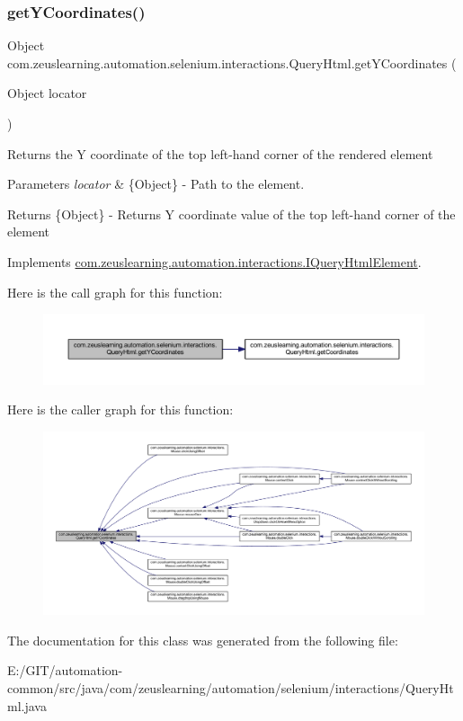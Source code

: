 \subsubsection{\texorpdfstring{get\+Y\+Coordinates()}{getYCoordinates()}}
{\footnotesize\ttfamily Object com.\+zeuslearning.\+automation.\+selenium.\+interactions.\+Query\+Html.\+get\+Y\+Coordinates (\begin{DoxyParamCaption}\item[{Object}]{locator }\end{DoxyParamCaption})\hspace{0.3cm}{\ttfamily [inline]}}

Returns the Y coordinate of the top left-\/hand corner of the rendered element


\begin{DoxyParams}{Parameters}
{\em locator} & \{Object\} -\/ Path to the element. \\
\hline
\end{DoxyParams}
\begin{DoxyReturn}{Returns}
\{Object\} -\/ Returns Y coordinate value of the top left-\/hand corner of the element 
\end{DoxyReturn}


Implements \hyperlink{interfacecom_1_1zeuslearning_1_1automation_1_1interactions_1_1IQueryHtmlElement_a7fa59044cee483ac710d06186d46776c}{com.\+zeuslearning.\+automation.\+interactions.\+I\+Query\+Html\+Element}.

Here is the call graph for this function\+:
\nopagebreak
\begin{figure}[H]
\begin{center}
\leavevmode
\includegraphics[width=350pt]{dc/d41/classcom_1_1zeuslearning_1_1automation_1_1selenium_1_1interactions_1_1QueryHtml_a3809f347197437c4f02974ac8a69637d_cgraph}
\end{center}
\end{figure}
Here is the caller graph for this function\+:
\nopagebreak
\begin{figure}[H]
\begin{center}
\leavevmode
\includegraphics[width=350pt]{dc/d41/classcom_1_1zeuslearning_1_1automation_1_1selenium_1_1interactions_1_1QueryHtml_a3809f347197437c4f02974ac8a69637d_icgraph}
\end{center}
\end{figure}


The documentation for this class was generated from the following file\+:\begin{DoxyCompactItemize}
\item 
E\+:/\+G\+I\+T/automation-\/common/src/java/com/zeuslearning/automation/selenium/interactions/Query\+Html.\+java\end{DoxyCompactItemize}
